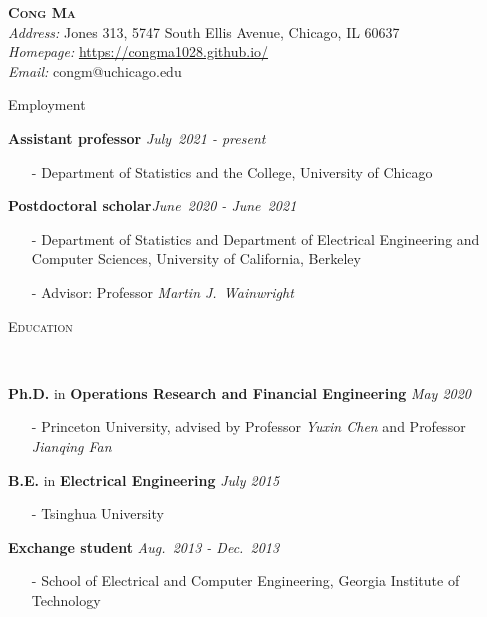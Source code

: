 \documentclass[a4paper, 10pt]{article}
\newenvironment{changemargin}[2]{%
  \begin{list}{}{%
    \setlength{\topsep}{0pt}%
    \setlength{\leftmargin}{#1}%
    \setlength{\rightmargin}{#2}%
    \setlength{\listparindent}{\parindent}%
    \setlength{\itemindent}{\parindent}%
    \setlength{\parsep}{\parskip}%
  }%
  \item[]}{\end{list}
}
\newcommand{\lineover}{
	\begin{changemargin}{-0.05in}{-0.05in}
		\vspace*{-8pt}
		\hrulefill \\
		\vspace*{-2pt}
	\end{changemargin}
}
\newcommand{\header}[1]{
	\begin{changemargin}{-0.5in}{-0.5in}
		\scshape{#1}\\
  	\lineover
	\end{changemargin}
}
\newcommand{\contact}[5]{
	\begin{changemargin}{-0.5in}{-0.5in}
		\begin{center}
			{\Large \scshape {#1}}\\ \smallskip
			{#2}\\ \smallskip
			{#3}\\ \smallskip
			{#4}\\ \smallskip
			{#5}\smallskip
		\end{center}
	\end{changemargin}
}
\newenvironment{body} {
	\vspace*{-16pt}
	\begin{changemargin}{-0.3in}{-0.5in}
  }	
	{\end{changemargin}
}
\begin{document}
\contact{\bf{Cong Ma}
\vspace{6pt}}{\emph{Address: } Jones 313, 5747 South Ellis Avenue,
Chicago, IL 60637}{\emph{Homepage:} \url{https://congma1028.github.io/}}{\emph{Email:} congm@uchicago.edu}



\header{\LARGE{Employment}}
\begin{body}
	\vspace{18pt}
	\textbf{Assistant professor} 
	 \hfill \emph{July~2021 - present} \\
	\begin{itemize}
		\item[-] Department of Statistics and the College, University of Chicago
	\end{itemize}
	
		\textbf{Postdoctoral scholar}\hfill \emph{June~2020 - June~2021} \\
    \begin{itemize}
      \item[-] Department of Statistics and Department of Electrical Engineering and Computer Sciences, University of California, Berkeley
      \item[-] Advisor: Professor \emph{Martin J.~Wainwright}
    \end{itemize}
\end{body}


\bigskip
\header{\LARGE{Education}}
\begin{body}
	\vspace{18pt}

	\textbf{Ph.D.} in \textbf{Operations Research and Financial Engineering} \hfill \emph{May 2020}
    \begin{itemize}
      \item[-] Princeton University, advised by Professor \emph{Yuxin Chen} and Professor \emph{Jianqing Fan}
    \end{itemize}
    \textbf{B.E.} in \textbf{Electrical Engineering} \hfill \emph{July 2015} \\
    \begin{itemize}
      \item[-] Tsinghua University
    \end{itemize}
    \textbf{Exchange student} \hfill \emph{Aug.~2013 - Dec.~2013} \\
    \begin{itemize}
      \item[-] School of Electrical and Computer Engineering, {Georgia Institute of Technology}
    \end{itemize}
\end{body}
\end{document}
